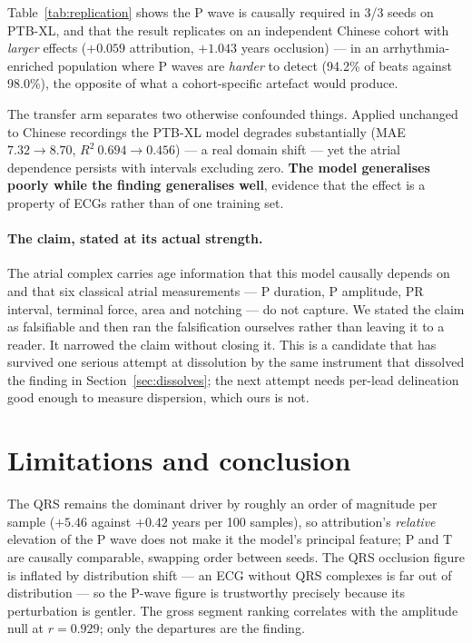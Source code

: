 \documentclass{article}
\begin{document}
Table~\ref{tab:replication} shows the P wave is causally required in 3/3 seeds on
PTB-XL, and that the result replicates on an independent Chinese cohort with
\emph{larger} effects ($+0.059$ attribution, $+1.043$ years occlusion) --- in an
arrhythmia-enriched population where P waves are \emph{harder} to detect (94.2\%
of beats against 98.0\%), the opposite of what a cohort-specific artefact would
produce.

The transfer arm separates two otherwise confounded things. Applied unchanged to
Chinese recordings the PTB-XL model degrades substantially (MAE $7.32 \to 8.70$,
$R^2\ 0.694 \to 0.456$) --- a real domain shift --- yet the atrial dependence
persists with intervals excluding zero. \textbf{The model generalises poorly
while the finding generalises well}, evidence that the effect is a property of
ECGs rather than of one training set.

\paragraph{The claim, stated at its actual strength.} The atrial complex carries
age information that this model causally depends on and that six classical
atrial measurements --- P duration, P amplitude, PR interval, terminal force,
area and notching --- do not capture. We stated the claim as falsifiable and then
ran the falsification ourselves rather than leaving it to a reader. It narrowed
the claim without closing it. This is a candidate that has survived one serious
attempt at dissolution by the same instrument that dissolved the finding in
Section~\ref{sec:dissolves}; the next attempt needs per-lead delineation good
enough to measure dispersion, which ours is not.

\section{Limitations and conclusion}

The QRS remains the dominant driver by roughly an order of magnitude per sample
($+5.46$ against $+0.42$ years per 100 samples), so attribution's \emph{relative}
elevation of the P wave does not make it the model's principal feature; P and T
are causally comparable, swapping order between seeds. The QRS occlusion figure
is inflated by distribution shift --- an ECG without QRS complexes is far out of
distribution --- so the P-wave figure is trustworthy precisely because its
perturbation is gentler. The gross segment ranking correlates with the amplitude
null at $r = 0.929$; only the departures are the finding.
\end{document}
